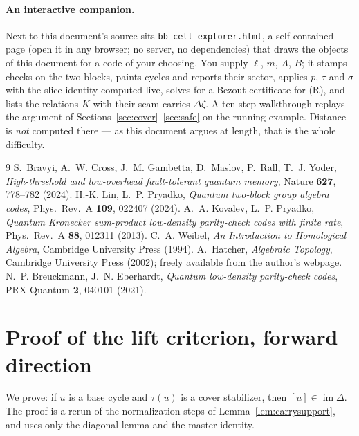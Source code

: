 \documentclass[11pt]{article}
\theoremstyle{plain}
\theoremstyle{definition}
\theoremstyle{remark}
\newcommand{\imD}{\operatorname{im}\Delta}
\begin{document}
\paragraph{An interactive companion.}
Next to this document's source sits \texttt{bb-cell-explorer.html}, a
self-contained page (open it in any browser; no server, no dependencies)
that draws the objects of this document for a code of your choosing. You
supply $\ell$, $m$, $A$, $B$; it
stamps checks on the two blocks, paints cycles and reports their sector,
applies $p$, $\tau$ and $\sigma$ with the slice identity computed live, solves
for a Bezout certificate for (R), and lists the relations $K$ with their seam
carries $\Delta\zeta$. A ten-step walkthrough replays the argument of
Sections~\ref{sec:cover}--\ref{sec:safe} on the running example. Distance is
\emph{not} computed there --- as this document argues at length, that is the
whole difficulty.

\begin{thebibliography}{9}
 S.~Bravyi, A.~W. Cross, J.~M. Gambetta, D.~Maslov, P.~Rall,
T.~J. Yoder, \emph{High-threshold and low-overhead fault-tolerant quantum
memory}, Nature \textbf{627}, 778--782 (2024).
 H.-K. Lin, L.~P. Pryadko, \emph{Quantum two-block group
algebra codes}, Phys.\ Rev.\ A \textbf{109}, 022407 (2024).
 A.~A. Kovalev, L.~P. Pryadko, \emph{Quantum
Kronecker sum-product low-density parity-check codes with finite rate},
Phys.\ Rev.\ A \textbf{88}, 012311 (2013).
 C.~A. Weibel, \emph{An Introduction to Homological
Algebra}, Cambridge University Press (1994).
 A.~Hatcher, \emph{Algebraic Topology}, Cambridge
University Press (2002); freely available from the author's webpage.
 N.~P. Breuckmann, J.~N. Eberhardt, \emph{Quantum
low-density parity-check codes}, PRX Quantum \textbf{2}, 040101 (2021).
\end{thebibliography}

\appendix

\section{Proof of the lift criterion, forward direction}
\label{app:liftproof}

We prove: if $u$ is a base cycle and $\tau(u)$ is a cover stabilizer, then
$[u] \in \imD$. The proof is a rerun of the normalization steps of
Lemma~\ref{lem:carrysupport}, and uses only the diagonal lemma and the master
identity.
\end{document}
